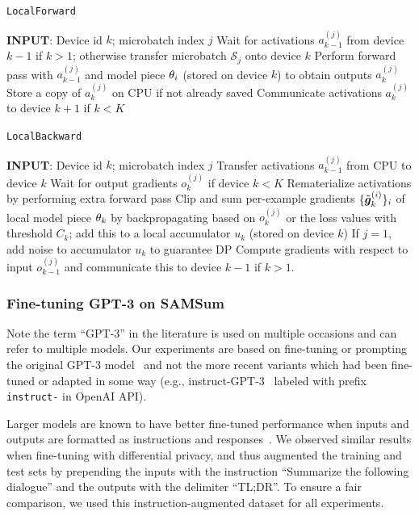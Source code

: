\begin{algorithm}[H]
    \centering
    \caption{ \texttt{LocalForward} }
    \begin{algorithmic}[1]
        \State \textbf{INPUT}: Device id $k$; microbatch index $j$ 
        \State Wait for activations $a_{k-1}^{(j)}$ from device $k-1$ if $k > 1$; otherwise transfer microbatch $\mathcal{S}_j$ onto device $k$
        \State Perform forward pass with $a_{k-1}^{(j)}$ and model piece $\mathbf{\theta}_i$ (stored on device $k$) to obtain outputs $a_{k}^{(j)}$
        \State Store a copy of $a_{k}^{(j)}$ on CPU if not already saved
        \State Communicate activations $a_{k}^{(j)}$ to device $k+1$ if $k < K$
    \end{algorithmic}
\end{algorithm}

\begin{algorithm}[H]
    \centering
    \caption{ \texttt{LocalBackward} }
    \begin{algorithmic}[1]
        \State \textbf{INPUT}: Device id $k$; microbatch index $j$
        \State Transfer activations $a_{k-1}^{(j)}$ from CPU to device $k$
        \State Wait for output gradients $o_{k}^{(j)}$ if device $k < K$
        \State Rematerialize activations by performing extra forward pass
        \State Clip and sum per-example gradients $\{ \tilde{\bm{g}}_k^{(i)} \}_i$ of local model piece $\mathbf{\theta}_k$ by backpropagating based on $o_{k}^{(j)}$ or the loss values with threshold $C_k$; add this to a local accumulator $u_k$ (stored on device $k$)
        \State If $j=1$, add noise to accumulator $u_k$ to guarantee DP
        \State Compute gradients with respect to input $o_{k-1}^{(j)}$ and communicate this to device $k-1$ if $k > 1$. 
    \end{algorithmic}
\end{algorithm}


\subsubsection{Fine-tuning GPT-3 on SAMSum}
Note the term ``GPT-3'' in the literature is used on multiple occasions and can refer to multiple models. 
Our experiments are based on fine-tuning or prompting the original GPT-3 model~\citep{brown2020language} and not the more recent variants which had been fine-tuned or adapted in some way (e.g., instruct-GPT-3~\citep{ouyang2022training} labeled with prefix \texttt{instruct-} in OpenAI API). 


Larger models are known to have better fine-tuned performance when inputs and outputs are formatted as instructions and responses~\citep{wei2021finetuned,sanh2021multitask}. 
We observed similar results when fine-tuning with differential privacy, and thus augmented the training and test sets by prepending the inputs with the instruction ``Summarize the following dialogue'' and the outputs with the delimiter ``TL;DR''. 
To ensure a fair comparison, we used this instruction-augmented dataset for all experiments. 


